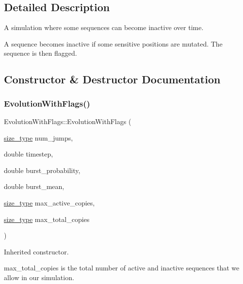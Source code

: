 \subsection{Detailed Description}
A simulation where some sequences can become inactive over time. 

A sequence becomes inactive if some sensitive positions are mutated. The sequence is then \textquotesingle{}flagged\textquotesingle{}. 

\subsection{Constructor \& Destructor Documentation}
\mbox{\label{classretrocombinator_1_1EvolutionWithFlags_a4e7809583d5dcf9cf9c1155587d7e99e}} 
\subsubsection{\texorpdfstring{Evolution\+With\+Flags()}{EvolutionWithFlags()}}
{\footnotesize\ttfamily Evolution\+With\+Flags\+::\+Evolution\+With\+Flags (\begin{DoxyParamCaption}\item[{\hyperlink{namespaceretrocombinator_a8e1541b50cee66a791df4c437ccbb385}{size\+\_\+type}}]{num\+\_\+jumps,  }\item[{double}]{timestep,  }\item[{double}]{burst\+\_\+probability,  }\item[{double}]{burst\+\_\+mean,  }\item[{\hyperlink{namespaceretrocombinator_a8e1541b50cee66a791df4c437ccbb385}{size\+\_\+type}}]{max\+\_\+active\+\_\+copies,  }\item[{\hyperlink{namespaceretrocombinator_a8e1541b50cee66a791df4c437ccbb385}{size\+\_\+type}}]{max\+\_\+total\+\_\+copies }\end{DoxyParamCaption})}



Inherited constructor. 

{\ttfamily max\+\_\+total\+\_\+copies} is the total number of active and inactive sequences that we allow in our simulation. 

